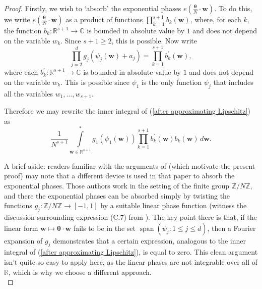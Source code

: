 \documentclass[12pt,a4paper,twoside,reqno]{amsart}
\newcommand{\spn}{\operatorname{span}}
\numberwithin{equation}{section}
\begin{document}
\begin{proof}
Firstly, we wish to `absorb' the exponential phases $ e(\frac{\boldsymbol{\theta}}{N}\cdot \mathbf{w})$. To do this, we write $ e(\frac{\boldsymbol{\theta}}{N}\cdot \mathbf{w})$ as a product of functions $\prod_{k=1}^{s+1}b_k(\mathbf{w})$, where, for each $k$, the function $b_k:\mathbb{R}^{s+1}\longrightarrow \mathbb{C}$ is bounded in absolute value by $1$ and does not depend on the variable $w_k$. Since $s+1\geqslant 2$, this is possible. Now write \[ \prod\limits_{j=2}^d g_j(\psi_j(\mathbf{w}) + a_j) = \prod\limits_{k=1}^{s+1} b_k^\prime(\mathbf{w}),\] where each $b_k^\prime: \mathbb{R}^{s+1} \longrightarrow \mathbb{C}$ is bounded in absolute value by $1$ and does not depend on the variable $w_k$. This is possible since $\psi_1$ is the only function $\psi_j$ that includes all the variables $w_1,\dots,w_{s+1}$. 

Therefore we may rewrite the inner integral of (\ref{after approximating Lipschitz}) as 
\begin{equation}
\label{phases absorbed}
\frac{1}{N^{s+1}}\int\limits_{\mathbf{w} \in\mathbb{R}^{s+1}} ^*  g_1(\psi_1(\mathbf{w})) \prod\limits_{k=1}^{s+1} b_k^\prime(\mathbf{w}) b_k(\mathbf{w})\, d\mathbf{w}.
\end{equation}

 
A brief aside: readers familiar with the arguments of \cite[Appendix C]{GT10} (which motivate the present proof) may note that a different device is used in that paper to absorb the exponential phases. Those authors work in the setting of the finite group $\mathbb{Z}/N\mathbb{Z}$, and there the exponential phases can be absorbed simply by twisting the functions $g_j:\mathbb{Z}/N\mathbb{Z}\longrightarrow [-1,1]$ by a suitable linear phase function (witness the discussion surrounding expression (C.7) from \cite{GT10}). The key point there is that, if the linear form $\mathbf{w}\mapsto\boldsymbol{\theta}\cdot\mathbf{w}$ fails to be in the set $\spn(\psi_j:1\leqslant j\leqslant d)$, then a Fourier expansion of $g_j$ demonstrates that a certain expression, analogous to the inner integral of (\ref{after approximating Lipschitz}), is equal to zero. This clean argument isn't quite so easy to apply here, as the linear phases are not integrable over all of $\mathbb{R}$, which is why we choose a different approach. \\


\end{proof}
\end{document}
